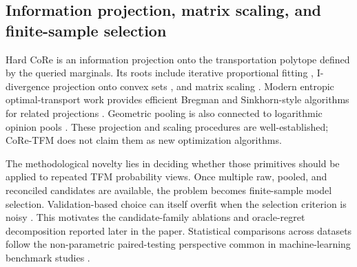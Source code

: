 \documentclass[a4paper,fleqn]{cas-sc}
\begin{document}
\subsection{Information projection, matrix scaling, and finite-sample selection}
Hard CoRe is an information projection onto the transportation polytope defined by the queried marginals. Its roots include iterative proportional fitting \citep{deming1940ipf}, I-divergence projection onto convex sets \citep{csiszar1975idiv}, and matrix scaling \citep{sinkhorn1964scaling}. Modern entropic optimal-transport work provides efficient Bregman and Sinkhorn-style algorithms for related projections \citep{cuturi2013sinkhorn,benamou2015bregman,chizat2018scaling}. Geometric pooling is also connected to logarithmic opinion pools \citep{heskes1997opinion}. These projection and scaling procedures are well-established; CoRe-TFM does not claim them as new optimization algorithms.

The methodological novelty lies in deciding whether those primitives should be applied to repeated TFM probability views. Once multiple raw, pooled, and reconciled candidates are available, the problem becomes finite-sample model selection. Validation-based choice can itself overfit when the selection criterion is noisy \citep{cawley2010overfitting}. This motivates the candidate-family ablations and oracle-regret decomposition reported later in the paper. Statistical comparisons across datasets follow the non-parametric paired-testing perspective common in machine-learning benchmark studies \citep{demsar2006comparisons}.

\begin{table}
\centering
\caption{Positioning of CoRe-TFM relative to neighboring lines of work. ``Outcome-gated'' means that held-out labels can determine whether the transformation is used.}
\label{tab:positioning}
\end{table}
\end{document}

